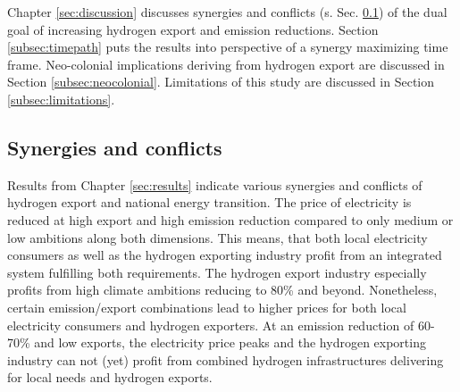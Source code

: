 Chapter \ref{sec:discussion} discusses synergies and conflicts (s. Sec. \ref{subsec:synergies-conflicts}) of the dual goal of increasing hydrogen export and emission reductions. Section \ref{subsec:timepath} puts the results into perspective of a synergy maximizing time frame. Neo-colonial implications deriving from hydrogen export are discussed in Section \ref{subsec:neocolonial}.
Limitations of this study are discussed in Section \ref{subsec:limitations}.



\subsection{Synergies and conflicts}
\label{subsec:synergies-conflicts}
Results from Chapter \ref{sec:results} indicate various synergies and conflicts of hydrogen export and national energy transition. The price of electricity is reduced at high export and high emission reduction compared to only medium or low ambitions along both dimensions. This means, that both local electricity consumers as well as the hydrogen exporting industry profit from an integrated system fulfilling both requirements. The hydrogen export industry especially profits from high climate ambitions reducing to 80\% and beyond. Nonetheless, certain emission/export combinations lead to higher prices for both local electricity consumers and hydrogen exporters. At an emission reduction of 60-70\% and low exports, the electricity price peaks and the hydrogen exporting industry can not (yet) profit from combined hydrogen infrastructures delivering for local needs and hydrogen exports.

